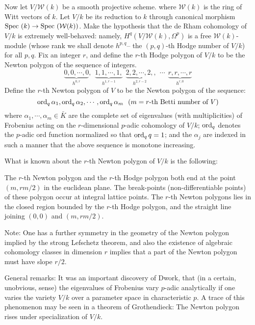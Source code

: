 	Now let $V/\mathcal{W}(k)$ be a smooth projective scheme. where $\mathcal{W}(k)$ is the ring of Witt vectors of $k$. Let $V/k$ be its reduction to $k$ through canonical morphism $ \text{Spec } (k) \to \text{Spec }(\mathcal{W}(k))$. Make the hypothesis that the de Rham cohomology of $V/k$ is extremely well-behaved: namely, $H^q(V/\mathcal{W}(k), \Omega^p)$ is a free $\mathcal{W}(k)$-module (whose rank we shall denote $h^{p,q}$-- the $(p,q)$-th Hodge number of $V/k$) for all $p,q$. Fix an integer $r$, and define the $r$-th Hodge polygon of $V/k$ to be the Newton polygon of the sequence of integers. 
	\[
	\underbrace{0,0,\cdots,0}_{h^{0,r}}, \ \ \underbrace{1,1,\cdots,1,}_{h^{1,r-1}}\ \ \underbrace{2,2,\cdots,2,}_{h^{2,r-2}},\ \ \cdots\ \ \underbrace{r,r,\cdots, r}_{h^{r,0}} 
	\]
	 Define the $r$-th Newton polygon of $V$ to be the Newton polygon of the sequence:
	 \[
	 \operatorname{ord}_q \alpha_1, \operatorname{ord}_q \alpha_2, \cdots, \operatorname{ord}_q \alpha_m\ \ (m= r\text{-th Betti number of  }V)
	 \]
	 where $\alpha_1, \cdots, \alpha_m \in \bar{K}$ are the complete set of eigenvalues (with multiplicities) of Frobenius acting on the $r$-dimensional $p$-adic cohomology of $V/k$; $\operatorname{ord}_q$ denotes the $p$-adic ord function normalized so that $\operatorname{ord}_q q =1$; and the $\alpha_j$ are indexed in such a manner that the above sequence is monotone increasing.
	 
	 What is known about the $r$-th Newton polygon of $V/k$ is the following:
	 
	 The $r$-th Newton polygon and the $r$-th Hodge polygon both end at the point $(m,rm/2)$ in the euclidean plane. The break-points (non-differentiable points) of these polygon occur at integral lattice points. The $r$-th Newton polygons lies in the closed region bounded by the $r$-th Hodge polygon, and the straight line joining $(0,0)$ and $(m,rm/2)$.
	 
	 Note: One has a further symmetry in the geometry of the Newton polygon implied by the strong Lefschetz theorem, and also the existence of algebraic cohomology classes in dimension $r$ implies that a part of the Newton polygon must have slope $r/2$.
	 
	 General remarks: It was an important discovery of Dwork, that (in a certain, unobvious, sense) the eigenvalues of Frobenius vary $p$-adic analytically if one varies the variety $V/k$ over a parameter space in characteristic $p$. A trace of this phenomenon may be seen in a theorem of Grothendieck: The Newton polygon rises under specialization of $V/k$.
	 
